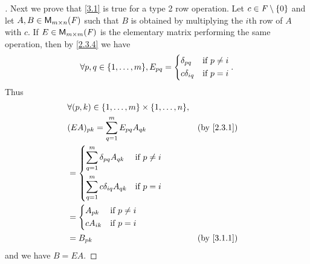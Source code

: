 \begin{proof}[]
  Next we prove that \cref{3.1} is true for a type 2 row operation.
  Let \(c \in \mathit{F} \setminus \left\lbrace0\right\rbrace\) and let \(A, B \in \ms\) such that \(B\) is obtained by multiplying the \(i\)th row of \(A\) with \(c\).
  If \(E \in \ms[m][m][\F]\) is the elementary matrix performing the same operation, then by \cref{2.3.4} we have
  \[
    \forall p, q \in \set{1, \dots, m}, E_{p q} = \begin{dcases}
      \delta_{p q}   & \text{if } p \neq i \\
      c \delta_{i q} & \text{if } p = i
    \end{dcases}.
  \]
  Thus
  \begin{align*}
     & \forall (p, k) \in \set{1, \dots, m} \times \set{1, \dots, n},                 \\
     & (EA)_{p k} = \sum_{q = 1}^m E_{p q} A_{q k}                    &  & \by{2.3.1} \\
     & = \begin{dcases}
           \sum_{q = 1}^m \delta_{p q} A_{q k}   & \text{if } p \neq i \\
           \sum_{q = 1}^m c \delta_{i q} A_{q k} & \text{if } p = i
         \end{dcases}                  \\
     & = \begin{dcases}
           A_{p k}   & \text{if } p \neq i \\
           c A_{i k} & \text{if } p = i
         \end{dcases}                                              \\
     & = B_{p k}                                                      &  & \by{3.1.1}
  \end{align*}
  and we have \(B = EA\).


\end{proof}
